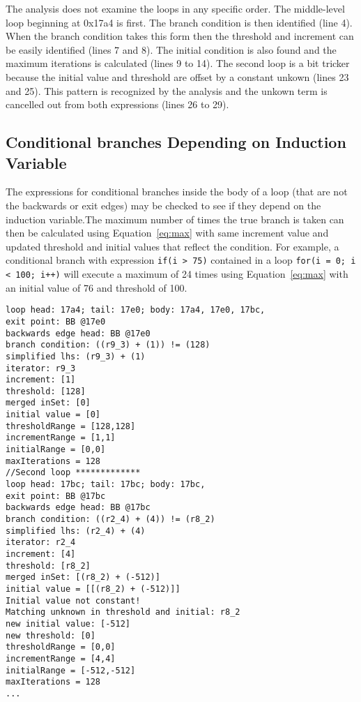 The analysis does not examine the loops in any specific order. The middle-level loop beginning at 0x17a4 is first. The branch condition is then identified (line 4). When the branch condition takes this form then the threshold and increment can be easily identified (lines 7 and 8). The initial condition is also found and the maximum iterations is calculated (lines 9 to 14). The second loop is a bit tricker because the initial value and threshold are offset by a constant unkown (lines 23 and 25). This pattern is recognized by the analysis and the unkown term is cancelled out from both expressions (lines 26 to 29).

\subsection{Conditional branches Depending on Induction Variable}
The expressions for conditional branches inside the body of a loop (that are not the backwards or exit edges) may be checked to see if they depend on the induction variable.The maximum number of times the true branch is taken can then be calculated using Equation~\ref{eq:max} with same increment value and updated threshold and initial values that reflect the condition. For example, a conditional branch with expression \texttt{if(i > 75)} contained in a loop \texttt{for(i = 0; i < 100; i++)} will execute a maximum of 24 times using Equation~\ref{eq:max} with an initial value of 76 and threshold of 100.
 
\begin{lstlisting}[caption={Example output for loop analysis on matrix multiplication code.},label={l:matmul-out},captionpos=t]
loop head: 17a4; tail: 17e0; body: 17a4, 17e0, 17bc,
exit point: BB @17e0
backwards edge head: BB @17e0
branch condition: ((r9_3) + (1)) != (128)
simplified lhs: (r9_3) + (1)
iterator: r9_3
increment: [1]
threshold: [128]
merged inSet: [0]
initial value = [0]
thresholdRange = [128,128]
incrementRange = [1,1]
initialRange = [0,0]
maxIterations = 128
//Second loop *************
loop head: 17bc; tail: 17bc; body: 17bc,
exit point: BB @17bc
backwards edge head: BB @17bc
branch condition: ((r2_4) + (4)) != (r8_2)
simplified lhs: (r2_4) + (4)
iterator: r2_4
increment: [4]
threshold: [r8_2]
merged inSet: [(r8_2) + (-512)]
initial value = [[(r8_2) + (-512)]]
Initial value not constant!
Matching unknown in threshold and initial: r8_2
new initial value: [-512]
new threshold: [0]
thresholdRange = [0,0]
incrementRange = [4,4]
initialRange = [-512,-512]
maxIterations = 128
...
\end{lstlisting}



